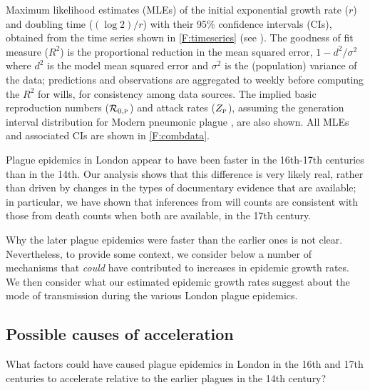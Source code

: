 \begin{table}[h!] 
  \caption[Estimated $r$ and $1/r$]{Maximum likelihood estimates (MLEs) of the initial exponential growth rate ($r$) and doubling time ($(\log2)/r$) with their 95\% confidence intervals (CIs), obtained from the time series shown in \cref{F:timeseries} (see \Methodslink).  The goodness of fit measure ($R^2$) is the proportional reduction in the mean squared error, \ie $1-d^2/\sigma^2$ where $d^2$ is the model mean squared error and $\sigma^2$ is the (population) variance of the data; predictions and observations are aggregated to weekly before computing the $R^2$ for wills, for consistency among data sources. The implied basic reproduction numbers (${\mathcal R}_{0,\mbox{\tiny P}}$) and attack rates ($Z_{\mbox{\tiny P}}$), assuming the generation interval distribution for Modern pneumonic plague \cite{GaniLeac04}, are also shown.
All MLEs and associated CIs are shown in \cref{F:combdata}.
}
\begin{center}
  \footnotesize
  

\end{center}
\label{tab:params}
\end{table}

\FloatBarrier
{}

Plague epidemics in London appear to have been faster in the 16th-17th centuries than in the 14th. Our analysis shows that this difference is very likely real, rather than driven by changes in the types of documentary evidence that are available; in particular, we have shown that inferences from will counts are consistent with those from death counts when both are available, in the 17th century.

Why the later plague epidemics were faster than the earlier ones is not clear.  Nevertheless, to provide some context, we consider below a number of mechanisms that \emph{could} have contributed to increases in epidemic growth rates.  We then consider what our estimated epidemic growth rates suggest about the mode of transmission during the various London plague epidemics.

\subsection*{Possible causes of acceleration}

What factors could have caused plague epidemics in London in the 16th and 17th centuries to accelerate relative to the earlier plagues in the 14th century?

